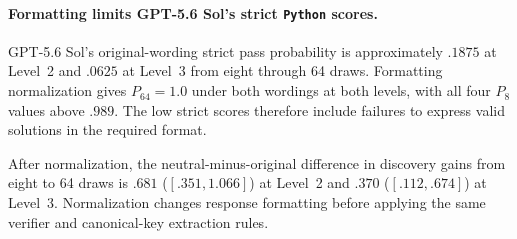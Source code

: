 \paragraph{Formatting limits GPT-5.6 Sol's strict \texttt{Python} scores.}
GPT-5.6 Sol's original-wording strict pass probability is approximately
$.1875$ at Level~2 and $.0625$ at Level~3 from eight through 64 draws.
Formatting normalization gives $P_{64}=1.0$ under both wordings at both
levels, with all four $P_8$ values above $.989$. The low strict scores
therefore include failures to express valid solutions in the required
format.

After normalization, the neutral-minus-original difference in
discovery gains from eight to 64 draws is $.681$ ($[.351,1.066]$) at Level~2 and $.370$
($[.112,.674]$) at Level~3. Normalization changes response formatting
before applying the same verifier and canonical-key extraction rules.
